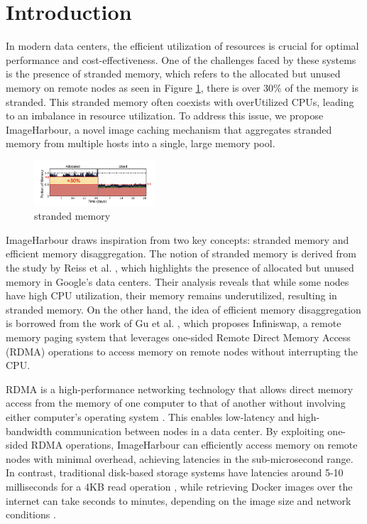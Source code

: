 \section{Introduction}
\label{sec:introduction}

In modern data centers, the efficient utilization of resources is crucial for optimal performance and cost-effectiveness. One of the challenges faced by these systems is the presence of stranded memory, which refers to the allocated but unused memory on remote nodes as seen in Figure \ref{fig:Stranded_memory}, there is over 30\% of the memory is stranded. This stranded memory often coexists with overUtilized CPUs, leading to an imbalance in resource utilization. To address this issue, we propose ImageHarbour, a novel image caching mechanism that aggregates stranded memory from multiple hosts into a single, large memory pool.

\begin{figure}[h]
    \centering
    \includegraphics[width=0.4\textwidth]{Stranded_memory.png}
    \caption{stranded memory}
    \label{fig:Stranded_memory}
\end{figure}

ImageHarbour draws inspiration from two key concepts: stranded memory and efficient memory disaggregation. The notion of stranded memory is derived from the study by Reiss et al. \cite{reiss2012heterogeneity}, which highlights the presence of allocated but unused memory in Google's data centers. Their analysis reveals that while some nodes have high CPU utilization, their memory remains underutilized, resulting in stranded memory. On the other hand, the idea of efficient memory disaggregation is borrowed from the work of Gu et al. \cite{gu2017efficient}, which proposes Infiniswap, a remote memory paging system that leverages one-sided Remote Direct Memory Access (RDMA) operations to access memory on remote nodes without interrupting the CPU.

RDMA is a high-performance networking technology that allows direct memory access from the memory of one computer to that of another without involving either computer's operating system \cite{kalia2016design}. This enables low-latency and high-bandwidth communication between nodes in a data center. By exploiting one-sided RDMA operations, ImageHarbour can efficiently access memory on remote nodes with minimal overhead, achieving latencies in the sub-microsecond range. In contrast, traditional disk-based storage systems have latencies around 5-10 milliseconds for a 4KB read operation \cite{yang2014don}, while retrieving Docker images over the internet can take seconds to minutes, depending on the image size and network conditions \cite{harter2016slacker}.

